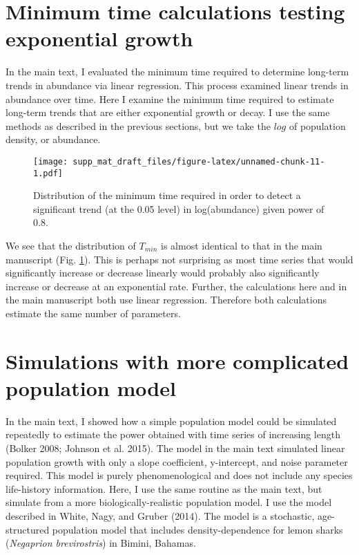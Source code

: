 \documentclass[12pt,]{article}
\begin{document}
\pagebreak

\section{Minimum time calculations testing exponential
growth}\label{minimum-time-calculations-testing-exponential-growth}

In the main text, I evaluated the minimum time required to determine
long-term trends in abundance via linear regression. This process
examined linear trends in abundance over time. Here I examine the
minimum time required to estimate long-term trends that are either
exponential growth or decay. I use the same methods as described in the
previous sections, but we take the \(log\) of population density, or
abundance.

\begin{figure}
\centering
\texttt{[image: supp\_mat\_draft\_files/figure-latex/unnamed-chunk-11-1.pdf]}
\caption{Distribution of the minimum time required in order to detect a
significant trend (at the 0.05 level) in log(abundance) given power of
0.8.\label{fig:min_time_dist_log_pop}}
\end{figure}

We see that the distribution of \(T_{min}\) is almost identical to that
in the main manuscript (Fig. \ref{fig:min_time_dist_log_pop}). This is
perhaps not surprising as most time series that would significantly
increase or decrease linearly would probably also significantly increase
or decrease at an exponential rate. Further, the calculations here and
in the main manuscript both use linear regression. Therefore both
calculations estimate the same number of parameters.

\pagebreak

\section{Simulations with more complicated population
model}\label{simulations-with-more-complicated-population-model}

In the main text, I showed how a simple population model could be
simulated repeatedly to estimate the power obtained with time series of
increasing length (Bolker 2008; Johnson et al. 2015). The model in the
main text simulated linear population growth with only a slope
coefficient, y-intercept, and noise parameter required. This model is
purely phenomenological and does not include any species life-history
information. Here, I use the same routine as the main text, but simulate
from a more biologically-realistic population model. I use the model
described in White, Nagy, and Gruber (2014). The model is a stochastic,
age-structured population model that includes density-dependence for
lemon sharks (\emph{Negaprion brevirostris}) in Bimini, Bahamas.
\end{document}
